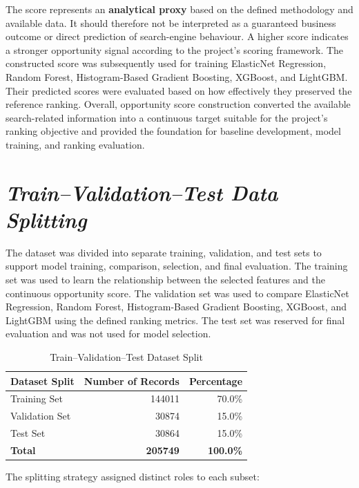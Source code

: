 \documentclass[12pt,a4paper]{report}
\begin{document}
The score represents an \textbf{analytical proxy} based on the defined methodology and available data. It should therefore not be interpreted as a guaranteed business outcome or direct prediction of search-engine behaviour. A higher score indicates a stronger opportunity signal according to the project's scoring framework. The constructed score was subsequently used for training ElasticNet Regression, Random Forest, Histogram-Based Gradient Boosting, XGBoost, and LightGBM. Their predicted scores were evaluated based on how effectively they preserved the reference ranking. Overall, opportunity score construction converted the available search-related information into a continuous target suitable for the project's ranking objective and provided the foundation for baseline development, model training, and ranking evaluation.

\section{\textit{Train--Validation--Test Data Splitting}}

The dataset was divided into separate training, validation, and test sets to support model training, comparison, selection, and final evaluation. The training set was used to learn the relationship between the selected features and the continuous opportunity score. The validation set was used to compare ElasticNet Regression, Random Forest, Histogram-Based Gradient Boosting, XGBoost, and LightGBM using the defined ranking metrics. The test set was reserved for final evaluation and was not used for model selection.

\begin{table}[htbp]
\centering
\caption{Train--Validation--Test Dataset Split}
\label{tab:data_split}
\begin{tabular}{|l|r|r|}
\hline
\textbf{Dataset Split} & \textbf{Number of Records} & \textbf{Percentage} \\
\hline
Training Set & 144011 & 70.0\% \\
\hline
Validation Set & 30874 & 15.0\% \\
\hline
Test Set & 30864 & 15.0\% \\
\hline
\textbf{Total} & \textbf{205749} & \textbf{100.0\%} \\
\hline
\end{tabular}
\end{table}

The splitting strategy assigned distinct roles to each subset:
\end{document}
